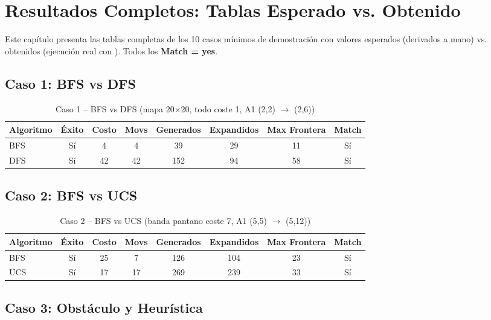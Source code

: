 \chapter{Resultados Completos: Tablas Esperado vs. Obtenido}
\label{ch:resultados}

Este capítulo presenta las tablas completas de los 10 casos mínimos de demostración con
valores esperados (derivados a mano) vs. obtenidos (ejecución real con ).
Todos los \textbf{Match = yes}.

\section{Caso 1: BFS vs DFS}
\label{sec:tabla-caso1}

\begin{table}[H]
\centering
\caption{Caso 1 -- BFS vs DFS (mapa 20$\times$20, todo coste 1, A1 (2,2) $\to$ (2,6))}
\begin{tabular}{lccccccc}
\toprule
Algoritmo & Éxito & Costo & Movs & Generados & Expandidos & Max Frontera & Match \\
\midrule
BFS & Sí & 4 & 4 & 39 & 29 & 11 & Sí \\
DFS & Sí & 42 & 42 & 152 & 94 & 58 & Sí \\
\bottomrule
\end{tabular}
\end{table}
\label{tab:caso1-full}


\section{Caso 2: BFS vs UCS}
\label{sec:tabla-caso2}

\begin{table}[H]
\centering
\caption{Caso 2 -- BFS vs UCS (banda pantano coste 7, A1 (5,5) $\to$ (5,12))}
\begin{tabular}{lccccccc}
\toprule
Algoritmo & Éxito & Costo & Movs & Generados & Expandidos & Max Frontera & Match \\
\midrule
BFS & Sí & 25 & 7 & 126 & 104 & 23 & Sí \\
UCS & Sí & 17 & 17 & 269 & 239 & 33 & Sí \\
\bottomrule
\end{tabular}
\end{table}
\label{tab:caso2-full}


\section{Caso 3: Obstáculo y Heurística}
\label{sec:tabla-caso3}

